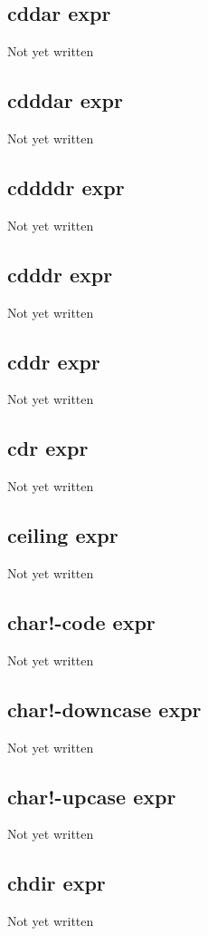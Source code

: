\documentclass[a4paper,11pt]{article}
\begin{document}
\subsection{\ttfamily cddar expr}
Not yet written

\subsection{\ttfamily cdddar expr}
Not yet written

\subsection{\ttfamily cddddr expr}
Not yet written

\subsection{\ttfamily cdddr expr}
Not yet written

\subsection{\ttfamily cddr expr}
Not yet written

\subsection{\ttfamily cdr expr}
Not yet written

\subsection{\ttfamily ceiling expr}
Not yet written

\subsection{\ttfamily char!-code expr}
Not yet written

\subsection{\ttfamily char!-downcase expr}
Not yet written

\subsection{\ttfamily char!-upcase expr}
Not yet written

\subsection{\ttfamily chdir expr}
Not yet written
\end{document}
